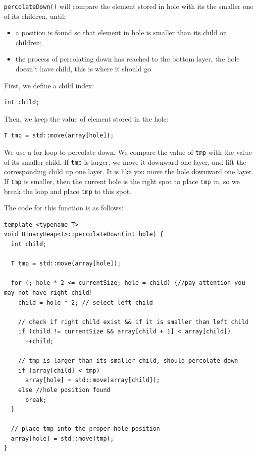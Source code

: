 \documentclass[11pt]{book}
\begin{document}
\texttt{percolateDown()} will compare the element stored in hole with its the smaller one of its children, until:
\begin{itemize}
\item a position is found so that element in hole is smaller than its child or children;
\item the process of percolating down has reached to the bottom layer, the hole doesn't have child, this is where it should go
\end{itemize}

First, we define a child index:
\begin{verbatim}
int child;
\end{verbatim}

Then, we keep the value of element stored in the hole:
\begin{verbatim}
T tmp = std::move(array[hole]);
\end{verbatim}

We use a for loop to percolate down. We compare the value of \texttt{tmp}  with the value of its smaller child. If \texttt{tmp} is larger, we move it downward one layer, and lift the corresponding child up one layer. It is like you move the hole downward one layer. If \texttt{tmp} is smaller, then the current hole is the right spot to place \texttt{tmp} in, so we break the loop and place \texttt{tmp} to this spot.

The code for this function is as follows:
\begin{verbatim}
template <typename T>
void BinaryHeap<T>::percolateDown(int hole) {
  int child;

  T tmp = std::move(array[hole]);

  for (; hole * 2 <= currentSize; hole = child) {//pay attention you may not have right child!
    child = hole * 2; // select left child

    // check if right child exist && if it is smaller than left child
    if (child != currentSize && array[child + 1] < array[child])
      ++child;

    // tmp is larger than its smaller child, should percolate down
    if (array[child] < tmp)
      array[hole] = std::move(array[child]);
    else //hole position found
      break; 
  }

  // place tmp into the proper hole position
  array[hole] = std::move(tmp);  
}
\end{verbatim}
\end{document}
